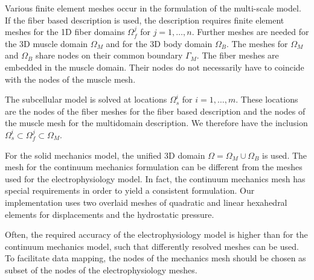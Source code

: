 Various finite element meshes occur in the formulation of the multi-scale model.
If the fiber based description is used, the description requires finite element meshes for the 1D fiber domains $\Omega_f^j$ for ${j=1,\dots,n}$. Further meshes are needed for the 3D muscle domain $\Omega_M$ and for the 3D body domain $\Omega_B$. The meshes for $\Omega_M$ and $\Omega_B$ share nodes on their common boundary $\Gamma_M$. The fiber meshes are embedded in the muscle domain. Their nodes do not necessarily have to coincide with the nodes of the muscle mesh.

The subcellular model is solved at locations $\Omega_s^i$ for $i=1,\dots,m$. These locations are the nodes of the fiber meshes for the fiber based description and the nodes of the muscle mesh for the multidomain description. We therefore have the inclusion $\Omega_s^i \subset \Omega_f^j \subset \Omega_M$.

For the solid mechanics model, the unified 3D domain $\Omega = \Omega_M \cup \Omega_B$ is used. The mesh for the continuum mechanics formulation can be different from the meshes used for the electrophysiology model. In fact, the continuum mechanics mesh has special requirements in order to yield a consistent formulation. Our implementation uses two overlaid meshes of quadratic and linear hexahedral elements for displacements and the hydrostatic pressure. 

Often, the required accuracy of the electrophysiology model is higher than for the continuum mechanics model, such that differently resolved meshes can be used. To facilitate data mapping, the nodes of the mechanics mesh should be chosen as subset of the nodes of the electrophysiology meshes.


